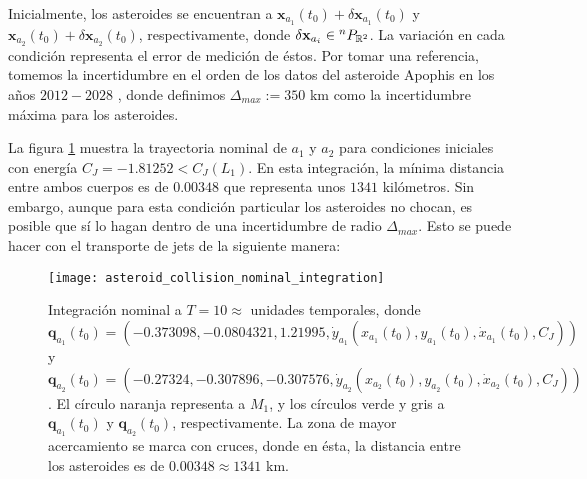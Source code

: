 Inicialmente, los asteroides se encuentran a $\mathbf{x}_{a_1}(t_0) + \delta\mathbf{x}_{a_1}(t_0)$  y $\mathbf{x}_{a_2}(t_0) + \delta\mathbf{x}_{a_2}(t_0)$, respectivamente, donde $\delta\mathbf{x}_{a_i} \in {^{n}P_{\mathbb{R}^ 2} }$. La variación en cada condición representa el error de medición de éstos. Por tomar una referencia, tomemos la incertidumbre en el orden de los datos del asteroide Apophis en los años $2012 - 2028$ \cite{Desmars2013}, donde definimos $\Delta_{max} := 350 $ km como la incertidumbre máxima para los asteroides.

La figura \ref{fig:asteroid_collision_nominal_integration} muestra la trayectoria nominal de $a_1$ y $a_2$ para condiciones iniciales con energía $C_J = -1.81252 < C_J(L_1)$. En esta integración, la mínima distancia entre ambos cuerpos es de $0.00348$ que representa unos $1341$ kilómetros. Sin embargo, aunque para esta condición particular los asteroides no chocan, es posible que sí lo hagan dentro de una incertidumbre de radio $\Delta_{max}$. Esto se puede hacer con el transporte de jets de la siguiente manera: 

\begin{figure}
 \centering
 \texttt{[image: asteroid\_collision\_nominal\_integration]}
 \caption{Integración nominal a $T=10 \approx $ unidades temporales, donde $\mathbf{q}_{a_1}(t_0) = \left( -0.373098, -0.0804321, 1.21995, \dot{y}_{a_1} \left( x_{a_1}(t_0), y_{a_1}(t_0), \dot{x}_{a_1}(t_0), C_J \right) \right)$ 
 y $\mathbf{q}_{a_2}(t_0) = \left( -0.27324, -0.307896, -0.307576, \dot{y}_{a_2} \left( x_{a_2}(t_0), y_{a_2}(t_0), \dot{x}_{a_2}(t_0), C_J \right) \right)$. El círculo naranja representa a $M_1$, y los círculos verde y gris a $\mathbf{q}_{a_1}(t_0)$ y $\mathbf{q}_{a_2}(t_0)$, respectivamente. La zona de mayor acercamiento se marca con cruces, donde en ésta, la distancia entre los asteroides es de $0.00348 \approx 1341$ km.}
 \label{fig:asteroid_collision_nominal_integration}
\end{figure}

